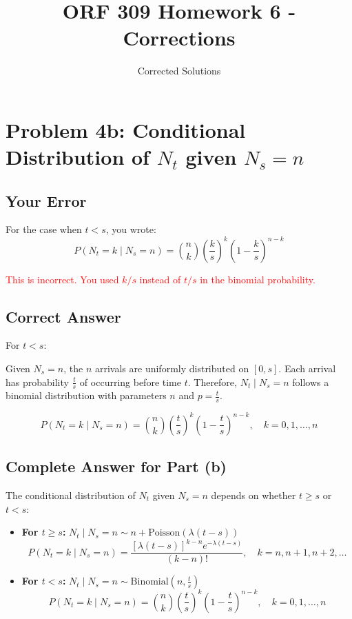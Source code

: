 \documentclass[12pt]{article}
\title{ORF 309 Homework 6 - Corrections}
\author{Corrected Solutions}
\date{}
\begin{document}
\maketitle

\section*{Problem 4b: Conditional Distribution of $N_t$ given $N_s = n$}

\subsection*{Your Error}

For the case when $t < s$, you wrote:
\begin{equation*}
P(N_t = k \mid N_s = n) = \binom{n}{k} \left(\frac{k}{s}\right)^k \left(1 - \frac{k}{s}\right)^{n-k}
\end{equation*}

\textcolor{red}{This is incorrect. You used $k/s$ instead of $t/s$ in the binomial probability.}

\subsection*{Correct Answer}

For $t < s$:

Given $N_s = n$, the $n$ arrivals are uniformly distributed on $[0, s]$. Each arrival has probability $\frac{t}{s}$ of occurring before time $t$. Therefore, $N_t \mid N_s = n$ follows a binomial distribution with parameters $n$ and $p = \frac{t}{s}$.

\begin{equation*}
\boxed{P(N_t = k \mid N_s = n) = \binom{n}{k} \left(\frac{t}{s}\right)^k \left(1 - \frac{t}{s}\right)^{n-k}, \quad k = 0, 1, \ldots, n}
\end{equation*}

\subsection*{Complete Answer for Part (b)}

The conditional distribution of $N_t$ given $N_s = n$ depends on whether $t \geq s$ or $t < s$:

\begin{itemize}[leftmargin=*]
    \item \textbf{For $t \geq s$:} $N_t \mid N_s = n \sim n + \text{Poisson}(\lambda(t-s))$
    \begin{equation*}
    P(N_t = k \mid N_s = n) = \frac{[\lambda(t-s)]^{k-n} e^{-\lambda(t-s)}}{(k-n)!}, \quad k = n, n+1, n+2, \ldots
    \end{equation*}

    \item \textbf{For $t < s$:} $N_t \mid N_s = n \sim \text{Binomial}\left(n, \frac{t}{s}\right)$
    \begin{equation*}
    P(N_t = k \mid N_s = n) = \binom{n}{k} \left(\frac{t}{s}\right)^k \left(1 - \frac{t}{s}\right)^{n-k}, \quad k = 0, 1, \ldots, n
    \end{equation*}
\end{itemize}
\end{document}
